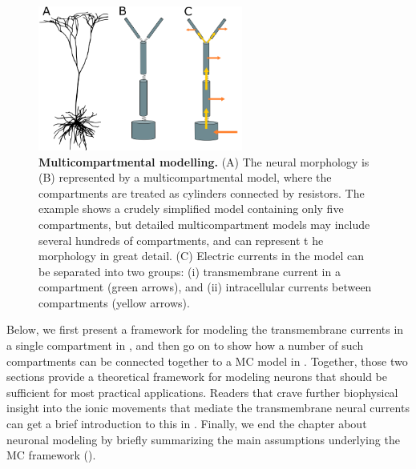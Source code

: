 \begin{figure}[!ht]
\begin{center}
\includegraphics[width=0.6\textwidth]{Figures/Neuron/multicompartment.png}
\end{center}
\caption{\textbf{Multicompartmental modelling.}  (A) The neural morphology is (B) represented by a multicompartmental model, where the compartments are treated as cylinders connected by resistors. The example shows a crudely simplified model containing only five compartments, but detailed multicompartment models may include several hundreds of compartments, and can represent t he morphology in great detail. (C) Electric currents in the model can be separated into two groups: (i) transmembrane current in a compartment (green arrows), and (ii) intracellular currents between compartments (yellow arrows). 
}
\label{fig:Neuron:multicomp}
\end{figure}

Below, we first present a framework for modeling the transmembrane currents in a single compartment in , and then go on to show how a number of such compartments can be connected together to a MC model in . Together, those two sections provide a theoretical framework for modeling neurons that should be sufficient for most practical applications. Readers that crave further biophysical insight into the ionic movements that mediate the transmembrane neural currents can get a brief introduction to this in . Finally, we end the chapter about neuronal modeling by briefly summarizing the main assumptions underlying the MC framework ().


